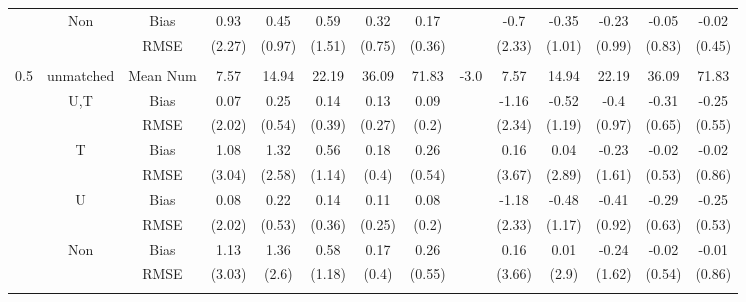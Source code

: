 \begin{tabular}{@{\extracolsep{5pt}}lc|cccccc|lccccc}
 & Non & Bias & 0.93 & 0.45 & 0.59 & 0.32 & 0.17 &  & -0.7 & -0.35 & -0.23 & -0.05 & -0.02 \\
 &  & RMSE & (2.27) & (0.97) & (1.51) & (0.75) & (0.36) &  & (2.33) & (1.01) & (0.99) & (0.83) & (0.45) \\
 &  &  &  &  &  &  &  &  &  &  &  &  &  \\
0.5 & unmatched & Mean Num & 7.57 & 14.94 & 22.19 & 36.09 & 71.83 & -3.0 & 7.57 & 14.94 & 22.19 & 36.09 & 71.83 \\
 & U,T & Bias & 0.07 & 0.25 & 0.14 & 0.13 & 0.09 &  & -1.16 & -0.52 & -0.4 & -0.31 & -0.25 \\
 &  & RMSE & (2.02) & (0.54) & (0.39) & (0.27) & (0.2) &  & (2.34) & (1.19) & (0.97) & (0.65) & (0.55) \\
 & T & Bias & 1.08 & 1.32 & 0.56 & 0.18 & 0.26 &  & 0.16 & 0.04 & -0.23 & -0.02 & -0.02 \\
 &  & RMSE & (3.04) & (2.58) & (1.14) & (0.4) & (0.54) &  & (3.67) & (2.89) & (1.61) & (0.53) & (0.86) \\
 & U & Bias & 0.08 & 0.22 & 0.14 & 0.11 & 0.08 &  & -1.18 & -0.48 & -0.41 & -0.29 & -0.25 \\
 &  & RMSE & (2.02) & (0.53) & (0.36) & (0.25) & (0.2) &  & (2.33) & (1.17) & (0.92) & (0.63) & (0.53) \\
 & Non & Bias & 1.13 & 1.36 & 0.58 & 0.17 & 0.26 &  & 0.16 & 0.01 & -0.24 & -0.02 & -0.01 \\
 &  & RMSE & (3.03) & (2.6) & (1.18) & (0.4) & (0.55) &  & (3.66) & (2.9) & (1.62) & (0.54) & (0.86) \\
 &  &  &  &  &  &  &  &  &  &  &  &  &  \\
\hline 
\bottomrule 
\end{tabular}
